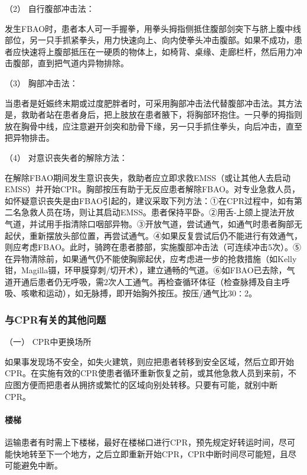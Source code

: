 \hypertarget{text00283.htmlux5cux23CHP10-1-4-5-3-2}{}
（2） 自行腹部冲击法：

发生FBAO时，患者本人可一手握拳，用拳头拇指侧抵住腹部剑突下与脐上腹中线部位，另一只手抓紧拳头，用力快速向上、向内使拳头冲击腹部。如果不成功，患者应快速将上腹部抵压在一硬质的物体上，如椅背、桌缘、走廊栏杆，然后用力冲击腹部，直到把气道内异物排除。

\hypertarget{text00283.htmlux5cux23CHP10-1-4-5-3-3}{}
（3） 胸部冲击法：

当患者是妊娠终末期或过度肥胖者时，可采用胸部冲击法代替腹部冲击法。其方法是，救助者站在患者身后，把上肢放在患者腋下，将胸部环抱住。一只拳的拇指则放在胸骨中线，应注意避开剑突和肋骨下缘，另一只手抓住拳头，向后冲击，直至把异物排击。

\hypertarget{text00283.htmlux5cux23CHP10-1-4-5-3-4}{}
（4） 对意识丧失者的解除方法：

在解除FBAO期间发生意识丧失，救助者应立即求救EMSS（或让其他人去启动EMSS）并开始CPR。胸部按压有助于无反应患者解除FBAO。对专业急救人员，如怀疑意识丧失是由FBAO引起的，建议采取下列方法：①在CPR过程中，如有第二名急救人员在场，则让其启动EMSS。患者保持平卧。②用舌-上颌上提法开放气道，并试用手指清除口咽部异物。③开放气道，尝试通气，如通气时患者胸部无起伏，重新摆放头部位置，再尝试通气。④如果反复尝试后仍不能进行有效通气，则应考虑FBAO。此时，骑跨在患者膝部，实施腹部冲击法（可连续冲击5次）。⑤在异物清除前，如果通气仍不能使胸廓起伏，应考虑进一步的抢救措施（如Kelly钳，Magilla镊，环甲膜穿刺/切开术），建立通畅的气道。⑥如FBAO已去除，气道开通后患者仍无呼吸，需2次人工通气。再检查循环体征（检查脉搏及自主呼吸、咳嗽和运动），如无脉搏，即开始胸外按压。按压/通气比30∶2。

\subsubsection{与CPR有关的其他问题}

\hypertarget{text00283.htmlux5cux23CHP10-1-4-6-1}{}
（一） CPR中更换场所

如果事发现场不安全，如失火建筑，则应把患者转移到安全区域，然后立即开始CPR。在实施有效的CPR使患者循环重新恢复之前，或其他急救人员到来前，不应图方便而把患者从拥挤或繁忙的区域向别处转移。只要有可能，就别中断CPR。

\paragraph{楼梯}

运输患者有时需上下楼梯，最好在楼梯口进行CPR，预先规定好转运时间，尽可能快地转至下一个地方，之后立即重新开始CPR，CPR中断时间尽可能短，且尽可能避免中断。

